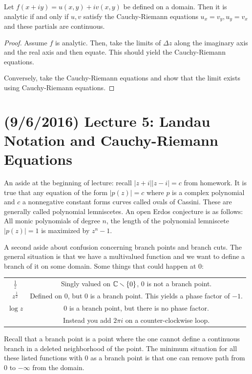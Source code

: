 \documentclass[11pt,leqno,oneside]{amsart}
\begin{document}
\begin{thm}
    Let $f(x+iy) = u(x,y)+iv(x,y)$ be defined on a domain. Then it is analytic
    if and only if $u,v$ satisfy the Cauchy-Riemann equations $u_x = v_y, u_y =
    v_x$ and these partials are continuous.
\end{thm}
\begin{proof}
    Assume $f$ is analytic. Then, take the limits of $\Delta z$ along the
    imaginary axis and the real axis and then equate. This should yield the
    Cauchy-Riemann equations.

    Conversely, take the Cauchy-Riemann equations and show that the limit
    exists using Cauchy-Riemann equations.
\end{proof}
\section{(9/6/2016) Lecture 5: Landau Notation and Cauchy-Riemann Equations}
\begin{rmk*}
    An aside at the beginning of lecture: recall $|z+i||z-i|=c$ from homework.
    It is true that any equation of the form $|p(z)| = c$ where $p$ is a
    complex polynomial and $c$ a nonnegative constant forms curves called ovals
    of Cassini. These are generally called polynomial lemniscetes. An open
    Erdos conjecture is as follows: \\

    All monic polynomials of degree $n$, the length of the polynomial
    lemniscete $|p(z)|=1$ is maximized by $z^n-1$.
\end{rmk*}

    A second aside about confusion concerning branch points and branch cuts.
    The general situation is that we have a multivalued function and we want to
    define a branch of it on some domain. Some things that could happen at 0:
    \\
    \begin{tabular}{|c|c|}
        \hline
        $\frac{1}{z}$ & Singly valued on ${\mathbb C} \smallsetminus \{0\}$, 0 is not a
        branch point. \\
        $z^{\frac{1}{2}}$ & Defined on 0, but 0 is a branch point. This yields
        a phase factor of $-1$. \\
        $\log z$ & 0 is a branch point, but there is no phase factor. \\ \ & Instead
        you add $2\pi i$ on a counter-clockwise loop. \\
        \hline
    \end{tabular}
    Recall that a branch point is a point where the one cannot define a
    continuous branch in a deleted neighborhood of the point. The minimum
    situation for all these listed functions with 0 as a branch point is that
    one can remove path from 0 to $-\infty$ from the domain.
\end{document}
